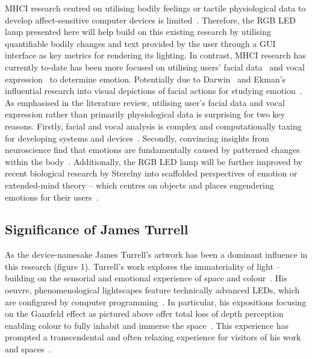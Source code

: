 \documentclass{sigchi}
\begin{document}
MHCI research centred on utilising bodily feelings or tactile physiological data to develop affect-sensitive computer devices is limited~\cite{pantic2008human}. Therefore, the RGB LED lamp presented here will help build on this existing research by utilising quantifiable bodily changes and text provided by the user through a GUI interface as key metrics for rendering its lighting. In contrast, MHCI research has currently to-date has been more focused on utilising users’ facial data~\cite{yang2015lighting} and vocal expression~\cite{davletcharova2015detection} to determine emotion. Potentially due to Darwin~\cite{hess2009darwin} and Ekman’s influential research into visual depictions of facial actions for studying emotion~\cite{ekman1992facial, ekman2003darwin, ekman2006darwin}. As emphasised in the literature review, utilising user’s facial data and vocal expression rather than primarily physiological data is surprising for two key reasons. Firstly, facial and vocal analysis is complex and computationally taxing for developing systems and devices~\cite{marechal2019survey}. Secondly, convincing insights from neuroscience find that emotions are fundamentally caused by patterned changes within the body~\cite{colombetti2014feeling, james1922emotions, laricchiuta2015embodied}. Additionally, the RGB LED lamp will be further improved by recent biological research by Sterelny into scaffolded perspectives of emotion or extended-mind theory – which centres on objects and places engendering emotions for their users~\cite{colombetti2015scaffoldings, sterelny2010minds, sterelny2004externalism}.


\subsection{Significance of James Turrell}

As the device-namesake James Turrell’s artwork has been a dominant influence in this research (figure 1). Turrell’s work explores the immateriality of light – building on the sensorial and emotional experience of space and colour~\cite{adcock1990james}. His oeuvre, phenomenological lightscapes feature technically advanced LEDs, which are configured by computer programming~\cite{hylton2013james}. In particular, his expositions focusing on the Ganzfeld effect as pictured above offer total loss of depth perception enabling colour to fully inhabit and immerse the space~\cite{basse2016light}. This experience has prompted a transcendental and often relaxing experience for visitors of his work and spaces~\cite{adcock1990james, basse2016light}.
\end{document}
